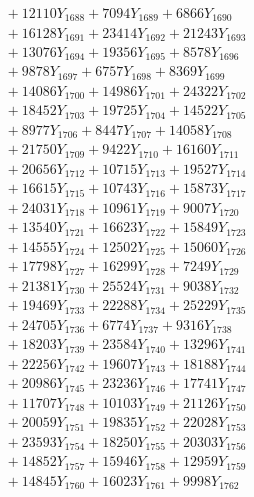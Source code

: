 \documentclass[a4paper,10pt]{article}
\begin{document}
{\begin{align}
&\;  + 12110 Y_{1688} + 7094 Y_{1689} + 6866 Y_{1690} \\[0.3ex]
&\;  + 16128 Y_{1691} + 23414 Y_{1692} + 21243 Y_{1693} \\[0.3ex]
&\;  + 13076 Y_{1694} + 19356 Y_{1695} + 8578 Y_{1696} \\[0.3ex]
&\;  + 9878 Y_{1697} + 6757 Y_{1698} + 8369 Y_{1699} \\[0.3ex]
&\;  + 14086 Y_{1700} + 14986 Y_{1701} + 24322 Y_{1702} \\[0.3ex]
&\;  + 18452 Y_{1703} + 19725 Y_{1704} + 14522 Y_{1705} \\[0.3ex]
&\;  + 8977 Y_{1706} + 8447 Y_{1707} + 14058 Y_{1708} \\[0.5ex]\allowbreak
&\;  + 21750 Y_{1709} + 9422 Y_{1710} + 16160 Y_{1711} \\[0.3ex]
&\;  + 20656 Y_{1712} + 10715 Y_{1713} + 19527 Y_{1714} \\[0.3ex]
&\;  + 16615 Y_{1715} + 10743 Y_{1716} + 15873 Y_{1717} \\[0.3ex]
&\;  + 24031 Y_{1718} + 10961 Y_{1719} + 9007 Y_{1720} \\[0.3ex]
&\;  + 13540 Y_{1721} + 16623 Y_{1722} + 15849 Y_{1723} \\[0.3ex]
&\;  + 14555 Y_{1724} + 12502 Y_{1725} + 15060 Y_{1726} \\[0.3ex]
&\;  + 17798 Y_{1727} + 16299 Y_{1728} + 7249 Y_{1729} \\[0.3ex]
&\;  + 21381 Y_{1730} + 25524 Y_{1731} + 9038 Y_{1732} \\[0.3ex]
&\;  + 19469 Y_{1733} + 22288 Y_{1734} + 25229 Y_{1735} \\[0.3ex]
&\;  + 24705 Y_{1736} + 6774 Y_{1737} + 9316 Y_{1738} \\[0.5ex]\allowbreak
&\;  + 18203 Y_{1739} + 23584 Y_{1740} + 13296 Y_{1741} \\[0.3ex]
&\;  + 22256 Y_{1742} + 19607 Y_{1743} + 18188 Y_{1744} \\[0.3ex]
&\;  + 20986 Y_{1745} + 23236 Y_{1746} + 17741 Y_{1747} \\[0.3ex]
&\;  + 11707 Y_{1748} + 10103 Y_{1749} + 21126 Y_{1750} \\[0.3ex]
&\;  + 20059 Y_{1751} + 19835 Y_{1752} + 22028 Y_{1753} \\[0.3ex]
&\;  + 23593 Y_{1754} + 18250 Y_{1755} + 20303 Y_{1756} \\[0.3ex]
&\;  + 14852 Y_{1757} + 15946 Y_{1758} + 12959 Y_{1759} \\[0.3ex]
&\;  + 14845 Y_{1760} + 16023 Y_{1761} + 9998 Y_{1762} \\[0.3ex]

\end{align}}
\end{document}
